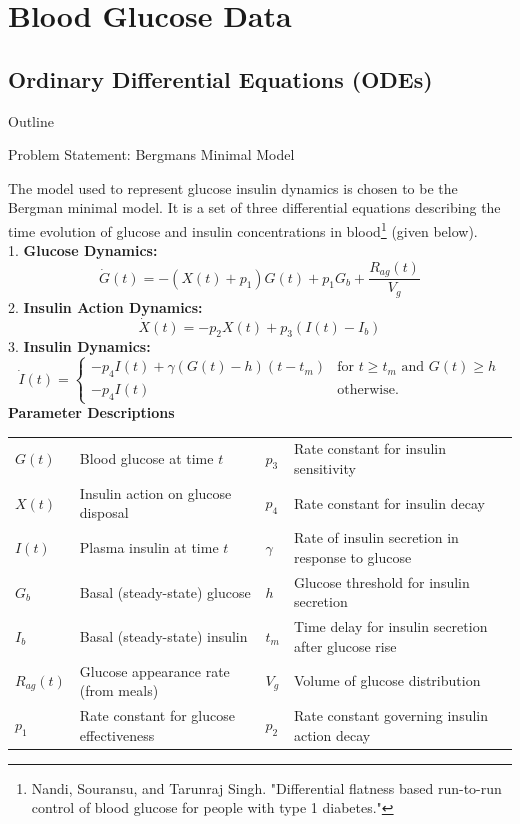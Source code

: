 \documentclass[8pt,xcolor=dvipsnames,compress]{beamer}
\begin{document}
\section{Blood Glucose Data}
\subsection{Ordinary Differential Equations (ODEs)}
\begin{frame}{Outline}
\end{frame}
%
\begin{frame}{Problem Statement: Bergmans Minimal Model}
\scriptsize

The model used to represent glucose insulin dynamics is chosen to be the Bergman minimal model. It is a set of three differential equations describing the time evolution of glucose and insulin concentrations in blood\footnote{Nandi, Souransu, and Tarunraj Singh. "Differential flatness based run-to-run control of blood glucose for people with type 1 diabetes."} (given below).\\

1. \textbf{Glucose Dynamics:}
\[
\dot{G}(t) = -(X(t) + p_1)G(t) + p_1 G_b + \frac{R_{ag}(t)}{V_g}
\]
2. \textbf{Insulin Action Dynamics:}
\[
\dot{X}(t) = -p_2 X(t) + p_3 (I(t) - I_b)
\]
3. \textbf{Insulin Dynamics:}
\[
\dot{I}(t) = 
\begin{cases}
   -p_4 I(t) + \gamma (G(t) - h)(t - t_m) & \text{for } t \geq t_m \text{ and } G(t) \geq h \\
   -p_4 I(t) & \text{otherwise}.
\end{cases}
\]
\textbf{Parameter Descriptions}
\begin{tabular}{ll|ll}
\hline

\hline
$G(t)$      & Blood glucose at time $t$             & $p_3$    & Rate constant for insulin sensitivity \\
$X(t)$      & Insulin action on glucose disposal    & $p_4$    & Rate constant for insulin decay \\
$I(t)$      & Plasma insulin at time $t$            & $\gamma$ & Rate of insulin secretion in response to glucose \\
$G_b$       & Basal (steady-state) glucose          & $h$      & Glucose threshold for insulin secretion \\
$I_b$       & Basal (steady-state) insulin          & $t_m$    & Time delay for insulin secretion after glucose rise \\
$R_{ag}(t)$ & Glucose appearance rate (from meals)  & $V_g$    & Volume of glucose distribution \\
$p_1$       & Rate constant for glucose effectiveness & $p_2$    & Rate constant governing insulin action decay \\
\hline
\end{tabular}
\end{frame}
\end{document}
